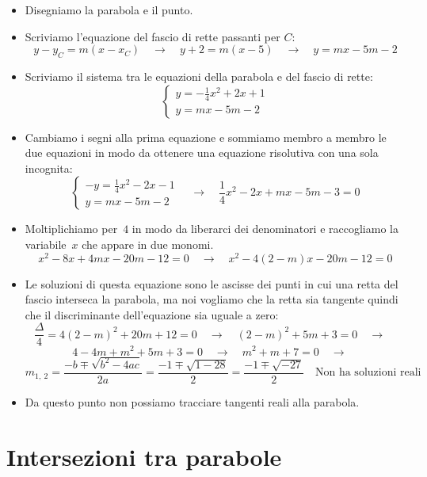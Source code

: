 \begin{exrig}
\begin{esempio}
 \begin{itemize}
  \item Disegniamo la parabola e il punto.
  \item Scriviamo l'equazione del fascio di rette passanti per $C$:
\[y-y_C = m(x-x_C) \quad \rightarrow \quad 
y+2 = m\left(x-5\right)
\quad \rightarrow \quad y=mx-5m-2\]
  \item Scriviamo il sistema tra le equazioni della parabola e del fascio di 
   rette:
\[\left\{\begin{array}{l}
  y=-\frac{1}{4}x^2+2x +1\\
  y=mx-5m-2
\end{array}\right. \]
  \item Cambiamo i segni alla prima equazione e sommiamo membro a membro le
   due equazioni in modo da ottenere una equazione risolutiva con una sola 
   incognita:
\[\left\{\begin{array}{l}
  -y=\frac{1}{4}x^2-2x-1\\
  y=mx-5m-2
\end{array}\right. \quad \rightarrow \quad 
\frac{1}{4}x^2-2x+mx-5m-3=0\]
  \item Moltiplichiamo per~$4$ in modo da liberarci dei denominatori e 
   raccogliamo la variabile~$x$ che appare in due monomi.
\[x^2-8x+4mx-20m-12=0 \quad \rightarrow \quad x^2-4(2-m)x-20m-12=0\]
  \item Le soluzioni di questa equazione sono le ascisse dei punti in cui una 
   retta del fascio interseca la parabola, ma noi vogliamo che la retta sia
   tangente quindi che il discriminante dell'equazione sia uguale a zero:
\[\frac{\Delta}{4}=4(2-m)^2+20m+12=0 \quad \rightarrow \quad 
(2-m)^2+5m+3=0 \quad \rightarrow \quad\]
\[4-4m+m^2+5m+3=0 \quad \rightarrow \quad
m^2+m+7=0 \quad \rightarrow \quad\]
\[m_{1,~2}=\frac{-b \mp \sqrt{b^2-4ac}}{2a}=\frac{-1 \mp \sqrt{1-28}}{2}=
\frac{-1 \mp \sqrt{-27}}{2} \quad \text{Non ha soluzioni reali}\]
  \item Da questo punto non possiamo tracciare tangenti reali alla
   parabola.
 \end{itemize}
\end{esempio}

\end{exrig}

\section{Intersezioni tra parabole}
\label{sec:parabola_intersezioniparabole}

